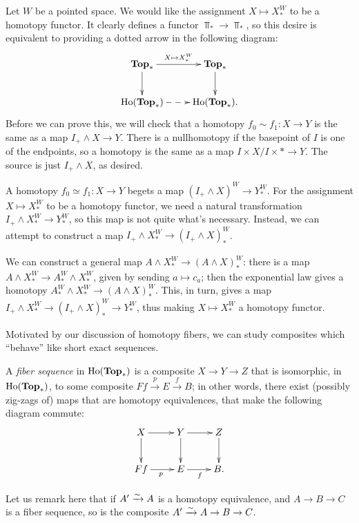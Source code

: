 Let $W$ be a pointed space.
We would like the assignment $X\mapsto X^W_\ast$ to be a homotopy functor.
It clearly defines a functor $\Top_\ast\to\Top_\ast$, so this desire is equivalent to providing a dotted arrow in the
following diagram:
\begin{equation*}
    \xymatrix{
	\Top_\ast\ar[d]\ar[r]^{X\mapsto X^W_\ast} & \Top_\ast\ar[d]\\
	\Ho(\Top_\ast)\ar@{-->}[r] & \Ho(\Top_\ast).
    }
\end{equation*}
Before we can prove this, we will check that a homotopy $f_0\sim f_1:X\to Y$ is the same as a map $I_+\wedge X\to Y$.
There is a nullhomotopy if the basepoint of $I$ is one of the endpoints, so a homotopy is the same as a map
$I\times X/I\times\ast \to Y$. The source is just $I_+\wedge X$, as desired.

A homotopy $f_0 \simeq f_1:X\to Y$ begets a map $(I_+\wedge X)^W\to Y^W_\ast$.
For the assignment $X\mapsto X^W_\ast$ to be a homotopy functor, we need a natural transformation $I_+\wedge X^W_\ast\to Y^W_\ast$, so this map is not quite what's necessary.
Instead, we can attempt to construct a map $I_+\wedge X^W_\ast\to (I_+\wedge X)^W_\ast$.

We can construct a general map $A\wedge X^W_\ast\to (A\wedge X)^W_\ast$: 
there is a map $A\wedge X^W_\ast\to A^W_\ast\wedge X^W_\ast$, given by sending $a\mapsto c_a$;
then the exponential law gives a homotopy $A^W_\ast\wedge X^W_\ast\to (A\wedge X)^W_\ast$.
This, in turn, gives a map $I_+\wedge X^W_\ast\to (I_+\wedge X)^W_\ast\to Y^W_\ast$,
thus making $X\mapsto X^W_\ast$ a homotopy functor.

Motivated by our discussion of homotopy fibers, we can study composites which ``behave'' like short exact sequences.
\begin{definition}
    A \emph{fiber sequence} in $\mathrm{Ho}(\mathbf{Top}_\ast)$ is a composite $X\to Y\to Z$ that is
    isomorphic, in $\mathrm{Ho}(\mathbf{Top}_\ast)$, to some composite $Ff\xrightarrow{p} E\xrightarrow{f}B$;
    in other words, there exist (possibly zig-zags of) maps that are homotopy equivalences, that make the following
    diagram commute:
    \begin{equation*}
	\xymatrix{
	    X\ar[r]\ar[d] & Y\ar[r]\ar[d] & Z\ar[d]\\
	    Ff\ar[r]_p & E\ar[r]_f & B.
	    }
    \end{equation*}
\end{definition}
Let us remark here that if $A^\prime \xrightarrow{{\sim}} A$ is a homotopy equivalence, and $A\to B \to C$ is a fiber sequence, so
is the composite $A^\prime\xrightarrow{{\sim}} A \to B\to C$.

